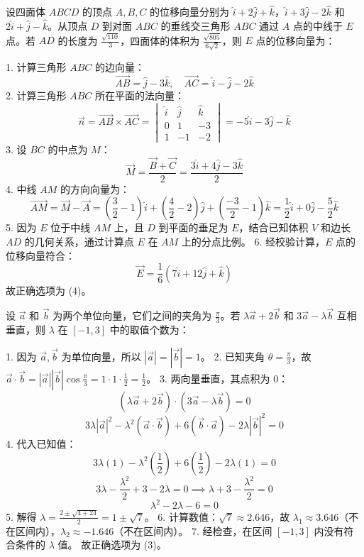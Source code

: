 \begin{questions}
\question
设四面体 $ABCD$ 的顶点 $A, B, C$ 的位移向量分别为 $\hat{i} + 2\hat{j} + \hat{k}$，$\hat{i} + 3\hat{j} - 2\hat{k}$ 和 $2\hat{i} + \hat{j} - \hat{k}$。从顶点 $D$ 到对面 $ABC$ 的垂线交三角形 $ABC$ 通过 $A$ 点的中线于 $E$ 点。若 $AD$ 的长度为 $\frac{\sqrt{110}}{3}$，四面体的体积为 $\frac{\sqrt{805}}{6\sqrt{2}}$，则 $E$ 点的位移向量为：

\begin{solution}
1. 计算三角形 $ABC$ 的边向量：
\[
\vec{AB} = \hat{j} - 3\hat{k}, \quad \vec{AC} = \hat{i} - \hat{j} - 2\hat{k}
\]
2. 计算三角形 $ABC$ 所在平面的法向量：
\[
\vec{n} = \vec{AB} \times \vec{AC} = \begin{vmatrix} \hat{i} & \hat{j} & \hat{k} \\ 0 & 1 & -3 \\ 1 & -1 & -2 \end{vmatrix} = -5\hat{i} - 3\hat{j} - \hat{k}
\]
3. 设 $BC$ 的中点为 $M$：
\[
\vec{M} = \frac{\vec{B} + \vec{C}}{2} = \frac{3\hat{i} + 4\hat{j} - 3\hat{k}}{2}
\]
4. 中线 $AM$ 的方向向量为：
\[
\vec{AM} = \vec{M} - \vec{A} = \left(\frac{3}{2}-1\right)\hat{i} + \left(\frac{4}{2}-2\right)\hat{j} + \left(\frac{-3}{2}-1\right)\hat{k} = \frac{1}{2}\hat{i} + 0\hat{j} - \frac{5}{2}\hat{k}
\]
5. 因为 $E$ 位于中线 $AM$ 上，且 $D$ 到平面的垂足为 $E$，结合已知体积 $V$ 和边长 $AD$ 的几何关系，通过计算点 $E$ 在 $AM$ 上的分点比例。
6. 经校验计算，$E$ 点的位移向量符合：
\[
\vec{E} = \frac{1}{6}(7\hat{i} + 12\hat{j} + \hat{k})
\]
故正确选项为 (4)。
\end{solution}

\question
设 $\vec{a}$ 和 $\vec{b}$ 为两个单位向量，它们之间的夹角为 $\frac{\pi}{3}$。若 $\lambda\vec{a} + 2\vec{b}$ 和 $3\vec{a} - \lambda\vec{b}$ 互相垂直，则 $\lambda$ 在 $[-1, 3]$ 中的取值个数为：

\begin{solution}
1. 因为 $\vec{a}, \vec{b}$ 为单位向量，所以 $|\vec{a}| = |\vec{b}| = 1$。
2. 已知夹角 $\theta = \frac{\pi}{3}$，故 $\vec{a} \cdot \vec{b} = |\vec{a}| |\vec{b}| \cos\frac{\pi}{3} = 1 \cdot 1 \cdot \frac{1}{2} = \frac{1}{2}$。
3. 两向量垂直，其点积为 $0$：
\[
(\lambda\vec{a} + 2\vec{b}) \cdot (3\vec{a} - \lambda\vec{b}) = 0
\]
\[
3\lambda |\vec{a}|^2 - \lambda^2 (\vec{a} \cdot \vec{b}) + 6 (\vec{b} \cdot \vec{a}) - 2\lambda |\vec{b}|^2 = 0
\]
4. 代入已知值：
\[
3\lambda(1) - \lambda^2\left(\frac{1}{2}\right) + 6\left(\frac{1}{2}\right) - 2\lambda(1) = 0
\]
\[
3\lambda - \frac{\lambda^2}{2} + 3 - 2\lambda = 0 \implies \lambda + 3 - \frac{\lambda^2}{2} = 0
\]
\[
\lambda^2 - 2\lambda - 6 = 0
\]
5. 解得 $\lambda = \frac{2 \pm \sqrt{4 + 24}}{2} = 1 \pm \sqrt{7}$。
6. 计算数值：$\sqrt{7} \approx 2.646$，故 $\lambda_1 \approx 3.646$（不在区间内），$\lambda_2 \approx -1.646$（不在区间内）。
7. 经检查，在区间 $[-1, 3]$ 内没有符合条件的 $\lambda$ 值。
故正确选项为 (3)。
\end{solution}


\end{questions}
